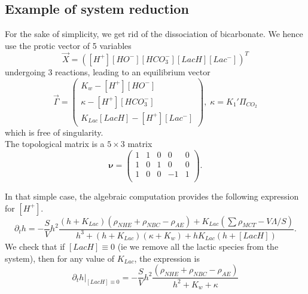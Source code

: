 \documentclass{revtex4}
\begin{document}
\subsection{Example of system reduction}
For the sake of simplicity, we get rid of the dissociation of bicarbonate.
We hence use the protic vector of 5 variables
\begin{equation}
	\vec{X} = \left( \left[H^+\right]  \left[HO^-\right] \left[HCO_3^-\right] \left[LacH\right]  \left[Lac^-\right] \right)^T
\end{equation}
undergoing 3 reactions, leading to an equilibrium vector
\begin{equation}
	\vec{\Gamma} =
	 \begin{pmatrix}
	K_w - \left[H^+\right]  \left[HO^-\right]\\
	 \kappa - \left[H^+\right]\left[HCO_3^-\right]\\
	K_{Lac}\left[LacH\right] - \left[H^+\right]\left[Lac^-\right]
	\end{pmatrix}, \;\kappa=K_1'\Pi_{CO_2}
\end{equation}
which is free of singularity.\\
The topological matrix is a $5\times3$ matrix
\begin{equation}
	\boldsymbol{\nu} =
	\begin{pmatrix}
	1 & 1 & 0 &  0 & 0\\
	1 & 0 & 1 &  0 & 0\\
	1 & 0 & 0 &  -1 & 1\\
	\end{pmatrix}.
\end{equation}

In that simple case, the algebraic computation provides the following expression for $\left[H^+\right]$.
\begin{equation}
\partial_t h = - \dfrac{S}{V} h^2
\dfrac{\left(h+K_{Lac}\right)\left(\rho_{NHE}+\rho_{NBC}-\rho_{AE}\right)+K_{Lac}\left(\sum \rho_{MCT}-V\Lambda/S\right)}
{h^3+(h+K_{Lac})\left(\kappa+K_w\right)+h K_{Lac}\left(h+\left[LacH\right]\right)}.
\end{equation}
We check that if $\left[LacH\right]\equiv0$ (ie we remove all the lactic species from the system), then for any value of $K_{Lac}$, the expression is
$$
	\partial_t h\vert_{\left[LacH\right]\equiv0} = 
	-\dfrac{S}{V} h^2
	\dfrac{\left(\rho_{NHE}+\rho_{NBC}-\rho_{AE}\right)}{h^2+K_w+\kappa}
$$
\end{document}
